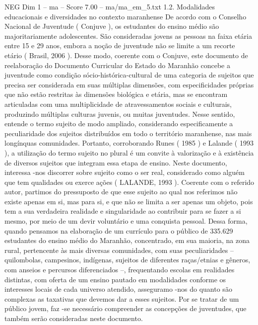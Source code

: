 \begin{textsample}{NEG Dim 1 – ma – Score 7.00 – ma/ma\_em\_5.txt}  \label{ex:f1_neg_230}
1.2.
Modalidades educacionais e diversidades no contexto maranhense De acordo com o Conselho Nacional de Juventude ( Conjuve ), os estudantes do ensino médio são majoritariamente adolescentes.
São consideradas jovens as pessoas na faixa etária entre 15 e 29 anos, embora a noção de juventude não se limite a um recorte etário ( Brasil, 2006 ).
Desse modo, coerente com o Conjuve, este documento de reelaboração do Documento Curricular do Estado do Maranhão concebe a juventude como condição sócio-histórica-cultural de uma categoria de sujeitos que precisa ser considerada em suas múltiplas dimensões, com especificidades próprias que não estão restritas às dimensões biológica e etária, mas se encontram articuladas com uma multiplicidade de atravessamentos sociais e culturais, produzindo múltiplas culturas juvenis, ou muitas juventudes.
Nesse sentido, entende o termo sujeito de modo ampliado, considerando especificamente a peculiaridade dos sujeitos distribuídos em todo o território maranhense, nas mais longínquas comunidades.
Portanto, corroborando Runes ( 1985 ) e Lalande ( 1993 ), a utilização do termo sujeito no plural é um convite à valorização e à existência de diversos sujeitos que integram essa etapa de ensino.
Neste documento, interessa -nos discorrer sobre sujeito como o ser real, considerado como alguém que tem qualidades ou exerce ações ( LALANDE, 1993 ).
Coerente com o referido autor, partimos do pressuposto de que esse sujeito ao qual nos referimos não existe apenas em si, mas para si, e que não se limita a ser apenas um objeto, pois tem a sua verdadeira realidade e singularidade ao contribuir para se fazer a si mesmo, por meio de um devir voluntário e uma conquista pessoal.
Dessa forma, quando pensamos na elaboração de um currículo para o público de 335.629 estudantes do ensino médio do Maranhão, concentrado, em sua maioria, na zona rural, pertencente às mais diversas comunidades, com suas peculiaridades – quilombolas, campesinos, indígenas, sujeitos de diferentes raças/etnias e gêneros, com anseios e percursos diferenciados –, frequentando escolas em realidades distintas, com oferta de um ensino pautado em modalidades conforme os interesses locais de cada universo atendido, asseguramo -nos do quanto são complexas as taxativas que devemos dar a esses sujeitos.
Por se tratar de um público jovem, faz -se necessário compreender as concepções de juventudes, que também serão consideradas neste documento.

\end{textsample}
